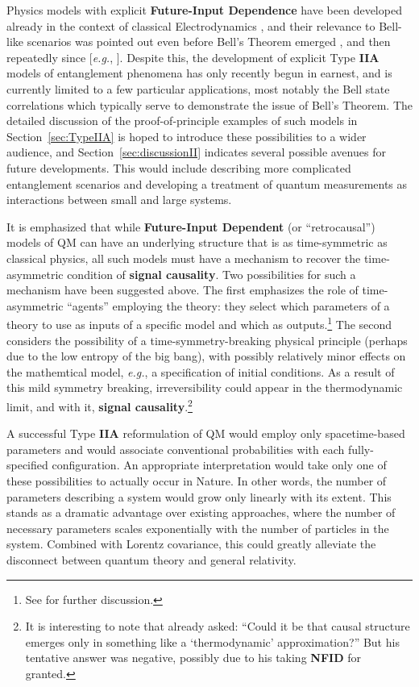 \documentclass[onecolumn, nofootinbib, 12pt]{revtex4-1}
\begin{document}
Physics models with explicit {\bf Future-Input Dependence} have been developed already in the context of classical Electrodynamics \cite{wheeler1945,wheeler1949}, and their relevance to Bell-like scenarios was pointed out even before Bell's Theorem emerged \cite{costa1953}, and then repeatedly since [\emph{e.g.}, \textcite{pegg1982,price1997}].  Despite this, the development of explicit Type {\bf IIA} models of entanglement phenomena has only recently begun in earnest, and is currently limited to a few particular applications, most notably the Bell state correlations which typically serve to demonstrate the issue of Bell's Theorem.  The detailed discussion of the proof-of-principle examples of such models in Section~\ref{sec:TypeIIA} is hoped to introduce these possibilities to a wider audience, and Section~\ref{sec:discussionII} indicates several possible avenues for future developments.  This would include describing more complicated entanglement scenarios and developing a treatment of quantum measurements as interactions between small and large systems. 

It is emphasized that while {\bf Future-Input Dependent} (or ``retrocausal'') models of QM can have an underlying structure that is as time-symmetric as classical physics, all such models must have a mechanism to recover the time-asymmetric condition of {\bf signal causality}.  Two possibilities for such a mechanism have been suggested above.  The first emphasizes the role of time-asymmetric ``agents'' employing the theory: they select which parameters of a theory to use as inputs of a specific model and which as outputs.\footnote{See \textcite{price1997} for further discussion.}  The second considers the possibility of a time-symmetry-breaking physical principle (perhaps due to the low entropy of the big bang), with possibly relatively minor effects on the mathemtical model, \emph{e.g.}, a specification of initial conditions.  As a result of this mild symmetry breaking, irreversibility could appear in the thermodynamic limit, and with it, {\bf signal causality}.\footnote{It is interesting to note that \textcite{bell1990} already asked: ``Could it be that causal structure emerges only in something like a `thermodynamic' approximation?''  But his tentative answer was negative, possibly due to his taking {\bf NFID} for granted.}

A successful Type {\bf IIA} reformulation of QM would employ only spacetime-based parameters and would associate conventional probabilities with each fully-specified configuration.  An appropriate interpretation would take only one of these possibilities to actually occur in Nature.  In other words, the number of parameters describing a system would grow only linearly with its extent.  This stands as a dramatic advantage over existing approaches, where the number of necessary parameters scales exponentially with the number of particles in the system.  Combined with {Lorentz covariance}, this could greatly alleviate the disconnect between quantum theory and general relativity.
\end{document}

